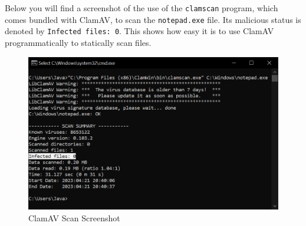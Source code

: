 Below you will find a screenshot of the use of the \texttt{clamscan} program,
which comes bundled with ClamAV, to scan the \texttt{notepad.exe} file.
Its malicious status is denoted by \texttt{Infected files: 0}.
This shows how easy it is to use ClamAV programmatically to statically scan files.

\begin{figure}[h!]
    \centering
    \label{image:clamscanScreenshot}
    \includegraphics[width=1\textwidth]{images/screenshots/clamscan}
    \caption{ClamAV Scan Screenshot}
\end{figure}
